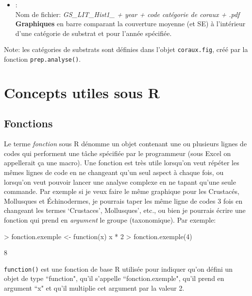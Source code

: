 \documentclass{article}
\begin{document}
\begin{itemize}
\item[] \hypertarget{l5}{}:\\
  Nom de fichier: \emph{GS\_LIT\_Hist1\_ + year + code catégorie de coraux
    + .pdf}\\
  \textbf{Graphiques} en barre comparant la
  couverture moyenne (et SE) à l'intérieur d'une catégorie de substrat
  et pour l'année spécifiée.

\end{itemize}

Note: les catégories de substrats sont définies dans l'objet
\texttt{coraux.fig}, créé par la fonction \texttt{prep.analyse()}.

\section{Concepts utiles sous R}
\subsection * {Fonctions}
Le terme \emph{fonction} sous R dénomme un objet contenant une ou plusieurs
lignes de codes qui performent une tâche spécifiée par le programmeur
(sous Excel on appellerait ça une macro). Une fonction
est très utile lorsqu'on veut répéter les mêmes lignes de code
en ne changeant qu'un seul aspect à chaque fois, ou lorsqu'on veut pouvoir
lancer une analyse complexe en ne tapant qu'une seule commande. Par exemple si je veux
faire le même graphique pour les Crustacés, Mollusques et
Échinodermes, je pourrais taper les même ligne de codes 3 fois en
changeant les termes `Crustaces', Mollusques', etc., ou bien je pourrais
écrire une fonction qui prend en \emph{argument} le groupe (taxonomique).
Par exemple:
\begin{Schunk}
\begin{Sinput}
> fonction.exemple <- function(x) x * 2
> fonction.exemple(4)
\end{Sinput}
\begin{Soutput}
[1] 8
\end{Soutput}
\end{Schunk}
\texttt{function()} est une fonction de base R utilisée pour
indiquer qu'on défini un objet de type ``function", qu'il s'appelle ``fonction.exemple",
qu'il prend en argument ``x" et qu'il multiplie cet argument par la
valeur 2.
\end{document}
